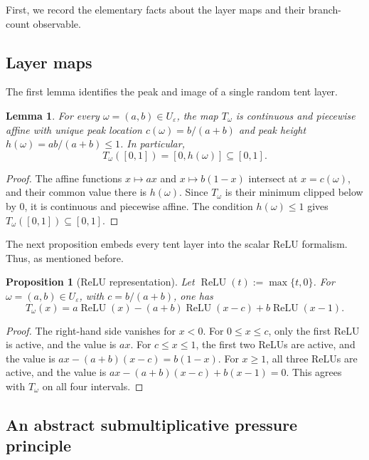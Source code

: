 \documentclass[11pt]{amsart}
\numberwithin{equation}{section}
\theoremstyle{plain}
\newtheorem{proposition}[theorem]{Proposition}
\newtheorem{lemma}[theorem]{Lemma}
\theoremstyle{definition}
\theoremstyle{remark}
\begin{document}
First, we record the elementary facts about the layer maps and their branch-count observable.

\subsection{Layer maps}

The first lemma identifies the peak and image of a single random tent layer.

\begin{lemma}\label{lem:tent-basic}
For every \(\omega=(a,b)\in U_\varepsilon\), the map \(T_\omega\) is continuous and piecewise affine with unique peak location \(c(\omega)=b/(a+b)\) and peak height \(h(\omega)=ab/(a+b)\le1\). In particular,
\[
T_\omega([0,1])=[0,h(\omega)]\subseteq [0,1].
\]
\end{lemma}

\begin{proof}
The affine functions \(x\mapsto ax\) and \(x\mapsto b(1-x)\) intersect at \(x=c(\omega)\), and their common value there is \(h(\omega)\). Since \(T_\omega\) is their minimum clipped below by \(0\), it is continuous and piecewise affine. The condition \(h(\omega)\le1\) gives \(T_\omega([0,1])\subseteq[0,1]\).
\end{proof}

The next proposition embeds every tent layer into the scalar ReLU formalism.
Thus, as mentioned before.
\begin{proposition}[ReLU representation]\label{prop:relu-representation}
Let \(\operatorname{ReLU}(t):=\max\{t,0\}\). For \(\omega=(a,b)\in U_\varepsilon\), with \(c=b/(a+b)\), one has
\[
T_\omega(x)=a\operatorname{ReLU}(x)-(a+b)\operatorname{ReLU}(x-c)+b\operatorname{ReLU}(x-1).
\]
\end{proposition}

\begin{proof}
The right-hand side vanishes for \(x<0\). For \(0\le x\le c\), only the first ReLU is active, and the value is \(ax\). For \(c\le x\le1\), the first two ReLUs are active, and the value is \(ax-(a+b)(x-c)=b(1-x)\). For \(x\ge1\), all three ReLUs are active, and the value is \(ax-(a+b)(x-c)+b(x-1)=0\). This agrees with \(T_\omega\) on all four intervals.
\end{proof}





\subsection{An abstract submultiplicative pressure principle}
\end{document}

